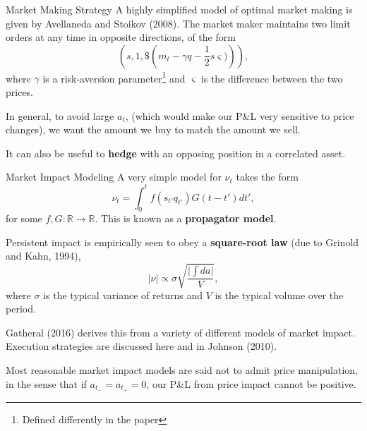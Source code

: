 \documentclass{beamer}
\begin{document}
\begin{frame}{Market Making Strategy}
	A highly simplified model of optimal market making is given by Avellaneda and Stoikov (2008). The market maker maintains two limit orders at any time in opposite directions, of the form
	$$\left(s, 1, \$\left(m_t - \gamma q - \frac{1}{2}s\varsigma)\right)\right),$$
	where $\gamma$ is a risk-aversion parameter\footnote{Defined differently in the paper} and $\varsigma$ is the difference between the two prices.

	In general, to avoid large $a_t$, (which would make our P\&L very sensitive to price changes), we want the amount we buy to match the amount we sell. 

	It can also be useful to \textbf{hedge} with an opposing position in a correlated asset.
\end{frame}

\begin{frame}{Market Impact Modeling}
	A very simple model for $\nu_t$ takes the form
	$$\nu_t = \int_0^t f(s_{t'}q_{t'})G(t-t')dt',$$
	for some $f,G:\mathbb{R}\to\mathbb{R}$. This is known as a \textbf{propagator model}.

	Persistent impact is empirically seen to obey a \textbf{square-root law} (due to Grinold and Kahn, 1994),
	$$\vert\nu\vert \propto \sigma\sqrt{\frac{\vert \int da\vert}{V}},$$
	where $\sigma$ is the typical variance of returns and $V$ is the typical volume over the period.

	Gatheral (2016) derives this from a variety of different models of market impact. Execution strategies are discussed here and in Johnson (2010).

	Most reasonable market impact models are said not to admit price manipulation, in the sense that if $a_{t_-}=a_{t_+}=0$, our P\&L from price impact cannot be positive.
\end{frame}
\end{document}
